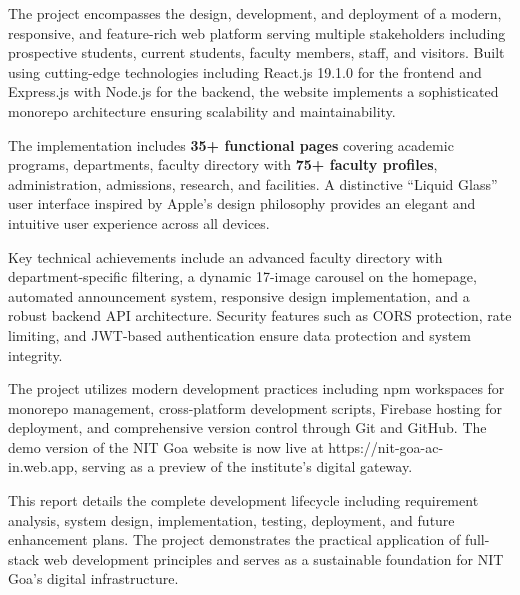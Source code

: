 \documentclass[12pt,a4paper]{report}
\begin{document}
The project encompasses the design, development, and deployment of a modern, responsive, and feature-rich web platform serving multiple stakeholders including prospective students, current students, faculty members, staff, and visitors. Built using cutting-edge technologies including React.js 19.1.0 for the frontend and Express.js with Node.js for the backend, the website implements a sophisticated monorepo architecture ensuring scalability and maintainability.

\vspace{0.5cm}

The implementation includes \textbf{35+ functional pages} covering academic programs, departments, faculty directory with \textbf{75+ faculty profiles}, administration, admissions, research, and facilities. A distinctive ``Liquid Glass'' user interface inspired by Apple's design philosophy provides an elegant and intuitive user experience across all devices.

\vspace{0.5cm}

Key technical achievements include an advanced faculty directory with department-specific filtering, a dynamic 17-image carousel on the homepage, automated announcement system, responsive design implementation, and a robust backend API architecture. Security features such as CORS protection, rate limiting, and JWT-based authentication ensure data protection and system integrity.

\vspace{0.5cm}

The project utilizes modern development practices including npm workspaces for monorepo management, cross-platform development scripts, Firebase hosting for deployment, and comprehensive version control through Git and GitHub. The demo version of the NIT Goa website is now live at https://nit-goa-ac-in.web.app, serving as a preview of the institute’s digital gateway.

\vspace{0.5cm}

This report details the complete development lifecycle including requirement analysis, system design, implementation, testing, deployment, and future enhancement plans. The project demonstrates the practical application of full-stack web development principles and serves as a sustainable foundation for NIT Goa's digital infrastructure.

\vspace{1cm}
\end{document}
